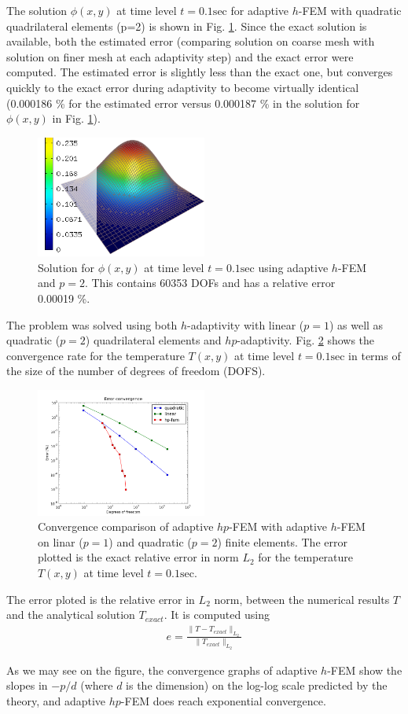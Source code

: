 The solution $\phi(x,y)$ at time level $t=0.1 \mbox{sec}$ for adaptive $h$-FEM with quadratic quadrilateral elements (p=2) is shown in Fig. \ref{sol_temp}.  Since the exact solution is available, both the estimated error (comparing solution on coarse mesh with solution on finer mesh at each adaptivity step) and the exact error were computed.  The estimated error is slightly less than the exact one, but converges quickly to the exact error during adaptivity to become virtually identical (0.000186 \% for the estimated error versus 0.000187 \% in the solution for $\phi(x,y)$ in Fig. \ref{sol_temp}).
\begin{figure}
  \includegraphics[width=0.5\textwidth]{figures/solution_T}
  \caption{Solution for $\phi(x,y)$ at time level $t=0.1 \mbox{sec}$ using adaptive $h$-FEM and $p=2$.  This contains 60353 DOFs and has a relative error 0.00019 \%.}
  \label{sol_temp}
\end{figure}

The problem was solved using both $h$-adaptivity with linear ($p=1$) as well as quadratic ($p=2$) quadrilateral elements and $hp$-adaptivity.  Fig. \ref{err_conv} shows the convergence rate for the temperature $T(x,y)$ at time level $t=0.1 \mbox{sec}$ in terms of the size of the number of degrees of freedom (DOFS).
\begin{figure}
  \includegraphics[width=0.5\textwidth]{figures/exact_err_conv}
  \caption{Convergence comparison of adaptive $hp$-FEM with adaptive $h$-FEM on linar ($p=1$) and quadratic ($p=2$) finite elements.  The error plotted is the exact relative error in norm $L_2$ for the temperature $T(x,y)$ at time level $t=0.1 \mbox{sec}$.}
  \label{err_conv}
\end{figure}

The error ploted is the relative error in $L_2$ norm, between the numerical results $T$ and the analytical solution $T_{exact}$.  It is computed using
\begin{align}
  e = \frac{ \|T-T_{exact}\|_{L_2} }{ \|T_{exact}\|_{L_2} }
\end{align}

As we may see on the figure, the convergence graphs of adaptive $h$-FEM show the slopes in $-p/d$ (where $d$ is the dimension) on the log-log scale predicted by the theory, and adaptive $hp$-FEM does reach exponential convergence.
